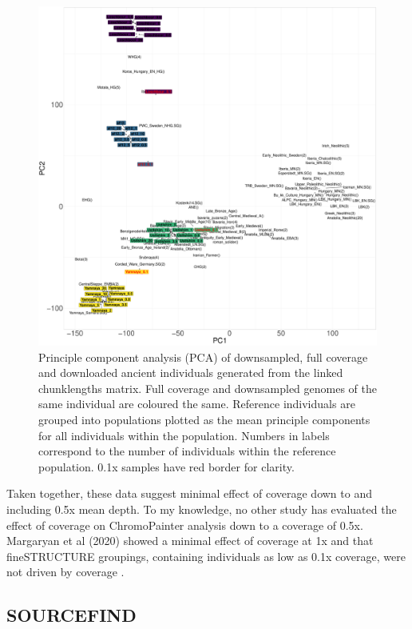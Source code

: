 \begin{figure}[htp]
    \centering
    \includegraphics[width=1.0\textwidth]{../images/chapter1/PCA_panel_allInds.allCoverage.pdf}
    \caption{Principle component analysis (PCA) of downsampled, full coverage and downloaded ancient individuals generated from the linked chunklengths matrix. Full coverage and downsampled genomes of the same individual are coloured the same. Reference individuals are grouped into populations plotted as the mean principle components for all individuals within the population. Numbers in labels correspond to the number of individuals within the reference population. 0.1x samples have red border for clarity.}
    \label{fig:PCA_panel_allInds_allCoverage}
\end{figure}

Taken together, these data suggest minimal effect of coverage down to and including 0.5x mean depth. To my knowledge, no other study has evaluated the effect of coverage on ChromoPainter analysis down to a coverage of 0.5x. Margaryan et al (2020) showed a minimal effect of coverage at 1x and that fineSTRUCTURE groupings, containing individuals as low as 0.1x coverage, were not driven by coverage \cite{margaryan2020population}. 



\subsection{SOURCEFIND}

